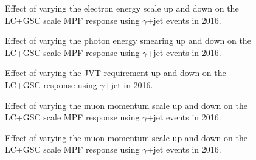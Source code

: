 \begin{figure}[!ht]
  \begin{center}
  \end{center}
  \caption[Effect of Egamma scale uncertainty on LC scale response with $\gamma$+jet]
  {Effect of varying the electron energy scale up and down on the LC+GSC scale MPF response using $\gamma$+jet events in 2016.}
  \label{plot:GJetLC2016EGScaleApp}
\end{figure}

\begin{figure}[!ht]
  \begin{center}
  \end{center}
  \caption[Egamma resolution uncertainty on LC scale response with $\gamma$+jet]
{Effect of varying the photon energy smearing up and down on the LC+GSC scale MPF response using $\gamma$+jet events in 2016.}
  \label{plot:GJetLC2016EGResolutionApp}
\end{figure}


\begin{figure}[!ht]
  \begin{center}
  \end{center}
  \caption[JVT uncertainty, LC+GSC scale with 2016 $\gamma$+jet]
  {Effect of varying the JVT requirement up and down on the LC+GSC response using $\gamma$+jet in 2016.}
  \label{plot:GJetLC2016JVTApp}
\end{figure}

\begin{figure}[!ht]
  \begin{center}
  \end{center}
  \caption[Muon inner detector uncertainty, LC+GSC scale with 2016 $\gamma$+jet]
  {Effect of varying the muon momentum scale up and down on the LC+GSC scale MPF response using $\gamma$+jet events in 2016.}
  \label{plot:GJetLC2016MScaleApp}
\end{figure}

\begin{figure}[!ht]
  \begin{center}
  \end{center}
  \caption[Muon inner detector uncertainty, LC+GSC scale with 2016 $\gamma$+jet]
  {Effect of varying the muon momentum scale up and down on the LC+GSC scale MPF response using $\gamma$+jet events in 2016.}
  \label{plot:GJetLC2016MScaleApp}
\end{figure}

